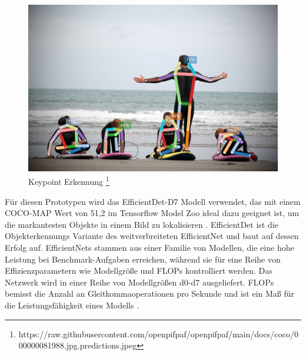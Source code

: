 \begin{figure}[htb]
	\centering
	\includegraphics[width=.9\textwidth]{images/keypoint-detection}
	\caption[Keypoint Erkennung]{Keypoint Erkennung \footnote{https://raw.githubusercontent.com/openpifpaf/openpifpaf/main/docs/coco/000000081988.jpg.predictions.jpeg}}
	\label{fig:keypoint-detection}
\end{figure}

Für diesen Prototypen wird das EfficientDet-D7 Modell verwendet, das mit einem \ac{COCO}-\ac{MAP} Wert von 51,2 im Tensorflow Model Zoo ideal dazu geeignet ist, um die markantesten Objekte in einem Bild zu lokalisieren \cite{efficientdet}. EfficientDet ist die Objekterkennungs Variante des weitverbreiteten EfficientNet \cite{tan2019efficientnet} und baut auf dessen Erfolg auf. EfficientNets stammen aus einer Familie von Modellen, die eine hohe Leistung bei Benchmark-Aufgaben erreichen, während sie für eine Reihe von Effizienzparametern wie Modellgröße und \acp{FLOP} kontrolliert werden. Das Netzwerk wird in einer Reihe von Modellgrößen d0-d7 ausgeliefert. \acp{FLOP} bemisst die Anzahl an Gleitkommaoperationen pro Sekunde und ist ein Maß für die Leistungsfähigkeit eines Modells \cite{object_detection_comparison}. 

